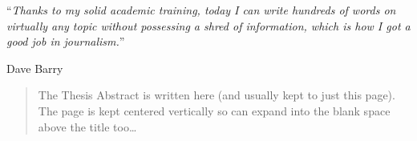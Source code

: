 \documentclass[
11pt, %
english, %
singlespacing, %
headsepline, %
openany
]{MastersDoctoralThesis} %
\begin{document}
\cleardoublepage


\vspace*{0.2\textheight}

\noindent\enquote{\itshape Thanks to my solid academic training, today I can write hundreds of words on virtually any topic without possessing a shred of information, which is how I got a good job in journalism.}\bigbreak

\hfill Dave Barry


\begin{abstract}
	\addchaptertocentry{\abstractname} %
	The Thesis Abstract is written here (and usually kept to just this page). The page is kept centered vertically so can expand into the blank space above the title too\ldots

\end{abstract}

\end{document}
